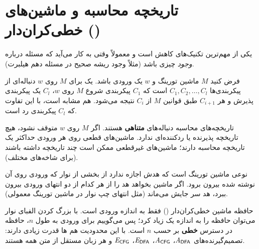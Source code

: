 \section{تاریخچه محاسبه و ماشین‌های خطی‌کران‌دار ()}

 یکی از مهم‌ترین تکنیک‌های کاهش است و معمولاً وقتی به کار می‌آید که مسئله درباره \emph{وجود} چیزی باشد (مثلاً وجود ریشه صحیح در مسئله دهم هیلبرت).

\begin{definition}
فرض کنید $M$ ماشین تورینگ و $w$ یک ورودی باشد. یک  برای $M$ روی $w$ دنباله‌ای از پیکربندی‌ها $C_1,C_2,\dots,C_l$ است که $C_1$ پیکربندی شروع $M$ روی $w$، $C_l$ یک پیکربندی پذیرش و هر $C_{i+1}$ طبق قوانین $M$ از $C_i$ نتیجه می‌شود.  هم مشابه است، با این تفاوت که $C_l$ پیکربندی رد است.
\end{definition}

تاریخچه‌های محاسبه دنباله‌های \textbf{متناهی} هستند. اگر $M$ روی $w$ متوقف نشود، هیچ تاریخچه پذیرنده یا ردکننده‌ای ندارد. ماشین‌های قطعی روی هر ورودی حداکثر یک تاریخچه محاسبه دارند؛ ماشین‌های غیرقطعی ممکن است چند تاریخچه داشته باشند (برای شاخه‌های مختلف).

\begin{definition}
 نوعی ماشین تورینگ است که هدش اجازه ندارد از بخشی از نوار که ورودی روی آن نوشته شده بیرون برود. اگر ماشین بخواهد هد را از هر کدام از دو انتهای ورودی بیرون ببرد، هد سر جایش می‌ماند (مثل انتهای چپ نوار در ماشین تورینگ معمولی).
\end{definition}
\begin{ltrfig}
\end{ltrfig}

حافظه ماشین خطی‌کران‌دار () فقط به اندازه ورودی است. با بزرگ کردن الفبای نوار می‌توان حافظه را به اندازه یک  زیاد کرد؛ پس می‌گوییم برای ورودی به طول $n$، حافظه در دسترس \textbf{خطی} بر حسب $n$ است. با این محدودیت هم ها قدرت زیادی دارند: تصمیم‌گیرنده‌های $\mathit{A}_{\mathsf{DFA}}$، $\mathit{A}_{\mathsf{CFG}}$، $\mathit{E}_{\mathsf{DFA}}$، $\mathit{E}_{\mathsf{CFG}}$ و هر زبان مستقل از متن همه  هستند.

